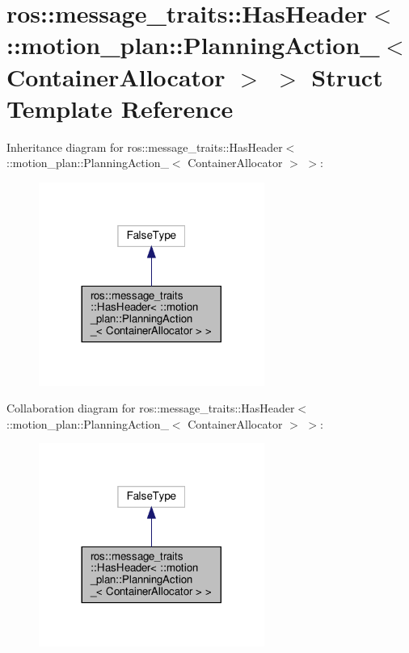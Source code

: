 \hypertarget{structros_1_1message__traits_1_1HasHeader_3_01_1_1motion__plan_1_1PlanningAction___3_01ContainerAllocator_01_4_01_4}{}\section{ros\+:\+:message\+\_\+traits\+:\+:Has\+Header$<$ \+:\+:motion\+\_\+plan\+:\+:Planning\+Action\+\_\+$<$ Container\+Allocator $>$ $>$ Struct Template Reference}
\label{structros_1_1message__traits_1_1HasHeader_3_01_1_1motion__plan_1_1PlanningAction___3_01ContainerAllocator_01_4_01_4}


Inheritance diagram for ros\+:\+:message\+\_\+traits\+:\+:Has\+Header$<$ \+:\+:motion\+\_\+plan\+:\+:Planning\+Action\+\_\+$<$ Container\+Allocator $>$ $>$\+:
\nopagebreak
\begin{figure}[H]
\begin{center}
\leavevmode
\includegraphics[width=209pt]{structros_1_1message__traits_1_1HasHeader_3_01_1_1motion__plan_1_1PlanningAction___3_01Container9fb64da17ceb8995ae5d3262083a7faa}
\end{center}
\end{figure}


Collaboration diagram for ros\+:\+:message\+\_\+traits\+:\+:Has\+Header$<$ \+:\+:motion\+\_\+plan\+:\+:Planning\+Action\+\_\+$<$ Container\+Allocator $>$ $>$\+:
\nopagebreak
\begin{figure}[H]
\begin{center}
\leavevmode
\includegraphics[width=209pt]{structros_1_1message__traits_1_1HasHeader_3_01_1_1motion__plan_1_1PlanningAction___3_01Container40b6f799a0717cd90272d0fafc327f9f}
\end{center}
\end{figure}


